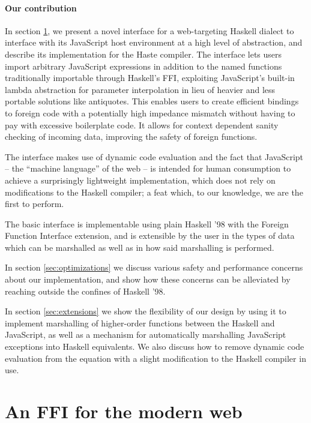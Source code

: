 \documentclass[preprint]{sigplanconf}
\begin{document}
\paragraph{Our contribution}\label{sec:contrib}
In section \ref{sec:interface}, we present a novel interface for a web-targeting
Haskell dialect to interface with its JavaScript host environment at a high level of
abstraction, and describe its implementation for the Haste compiler.
The interface lets users import arbitrary JavaScript expressions in addition
to the named functions traditionally importable through Haskell's FFI, exploiting
JavaScript's built-in lambda abstraction for parameter interpolation in lieu of
heavier and less portable solutions like antiquotes.
This enables users to create efficient bindings to foreign code with a potentially
high impedance mismatch without having to pay with excessive boilerplate code.
It allows for context dependent sanity checking of incoming data,
improving the safety of foreign functions.

The interface makes use of dynamic code evaluation and the fact that
JavaScript -- the ``machine language'' of the web -- is intended for human
consumption to achieve a surprisingly lightweight implementation, which
does not rely on modifications to the Haskell compiler; a feat which,
to our knowledge, we are the first to perform.

The basic interface is implementable using plain Haskell '98 with the
Foreign Function Interface extension, and is extensible by the user in the
types of data which can be marshalled as well as in how said marshalling is
performed.

In section \ref{sec:optimizations} we discuss various safety and performance
concerns about our implementation, and show how these concerns can be
alleviated by reaching outside the confines of Haskell '98.

In section \ref{sec:extensions} we show the flexibility of our design by using
it to implement marshalling of higher-order functions between the Haskell and
JavaScript, as well as a mechanism for automatically marshalling JavaScript
exceptions into Haskell equivalents.
We also discuss how to remove dynamic code evaluation from the equation
with a slight modification to the Haskell compiler in use.

\section{An FFI for the modern web}\label{sec:interface}
\end{document}
